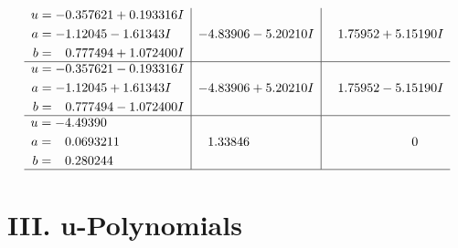 \documentclass[1p]{elsarticle_modified}
\theoremstyle{definition}
\begin{document}
$$\begin{array}{c|c|c}
\begin{aligned}
u &= -0.357621 + 0.193316 I \\
a &= -1.12045 - 1.61343 I \\
b &= \phantom{-}0.777494 + 1.072400 I\end{aligned}
 & -4.83906 - 5.20210 I & \phantom{-}1.75952 + 5.15190 I \\ \hline\begin{aligned}
u &= -0.357621 - 0.193316 I \\
a &= -1.12045 + 1.61343 I \\
b &= \phantom{-}0.777494 - 1.072400 I\end{aligned}
 & -4.83906 + 5.20210 I & \phantom{-}1.75952 - 5.15190 I \\ \hline\begin{aligned}
u &= -4.49390\phantom{ +0.000000I} \\
a &= \phantom{-}0.0693211\phantom{ +0.000000I} \\
b &= \phantom{-}0.280244\phantom{ +0.000000I}\end{aligned}
 & \phantom{-}1.33846\phantom{ +0.000000I} & \phantom{-0.000000 } 0\\
 \hline 
 \end{array}$$\newpage
\newpage\renewcommand{\arraystretch}{1}
\centering \section*{ III. u-Polynomials}
\end{document}
